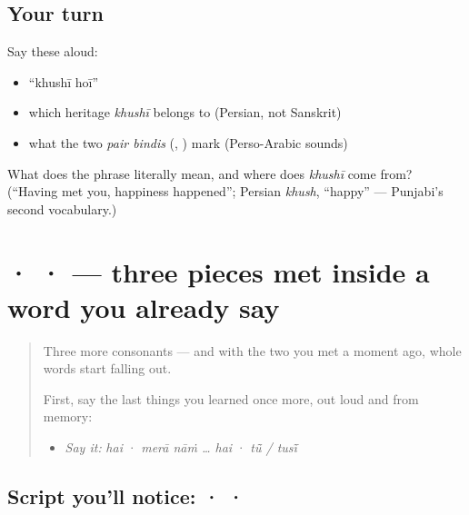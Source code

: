 \subsection*{Your turn}
Say these aloud:

\begin{itemize}
\raggedright
  \item \textquotedblleft{}khushī hoī\textquotedblright{}
  \item which heritage \emph{khushī} belongs to (Persian, not Sanskrit)
  \item what the two \emph{pair bindis} (, ) mark (Perso-Arabic sounds)
\end{itemize}

\begin{tcolorbox}[breakable,colback=teal!4,colframe=teal!35!black,title={Before you move on}]
What does the phrase literally mean, and where does \emph{khushī} come from? (\textquotedblleft{}Having met you, happiness happened\textquotedblright{}; Persian \emph{khush}, \textquotedblleft{}happy\textquotedblright{} — Punjabi's second vocabulary.)
\end{tcolorbox}
\section[\texorpdfstring{\pa{ਸ} · \pa{ਤ} · \pa{ਕ} (sa · ta · ka)}{ਸ · ਤ · ਕ (sa · ta · ka)}]{ ·  ·  — three pieces met inside a word you already say}

\label{lesson:PA-S02-sassa-tatta-sihari}



\begin{quote}
Three more consonants — and with the two you met a moment ago, whole words start falling out.

First, say the last things you learned once more, out loud and from memory:

\begin{itemize}
\raggedright
  \item \emph{Say it:} \emph{hai} · \emph{merā nāṁ … hai} · \emph{tū̃ / tusī̃}
\end{itemize}
\end{quote}

\subsection*{Script you'll notice:  ·  · }
\begin{quote}
\end{quote}

